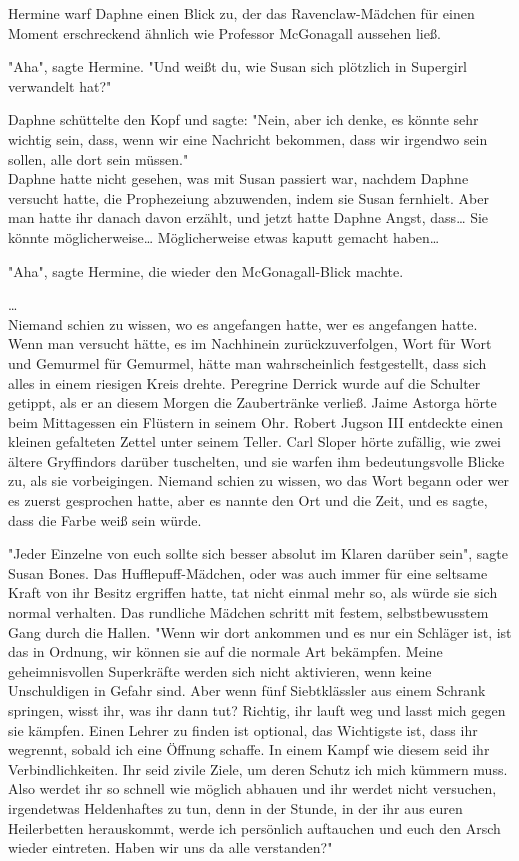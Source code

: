 {Hermine warf Daphne einen Blick zu, der das Ravenclaw-Mädchen für einen Moment erschreckend ähnlich wie Professor McGonagall aussehen ließ.

"Aha", sagte Hermine. "Und weißt du, wie Susan sich plötzlich in Supergirl verwandelt hat?"

Daphne schüttelte den Kopf und sagte: "Nein, aber ich denke, es könnte sehr wichtig sein, dass, wenn wir eine Nachricht bekommen, dass wir irgendwo sein sollen, alle dort sein müssen."\\ Daphne hatte nicht gesehen, was mit Susan passiert war, nachdem Daphne versucht hatte, die Prophezeiung abzuwenden, indem sie Susan fernhielt. Aber man hatte ihr danach davon erzählt, und jetzt hatte Daphne Angst, dass… Sie könnte möglicherweise… Möglicherweise etwas kaputt gemacht haben…

"Aha", sagte Hermine, die wieder den McGonagall-Blick machte.

…\\ Niemand schien zu wissen, wo es angefangen hatte, wer es angefangen hatte. Wenn man versucht hätte, es im Nachhinein zurückzuverfolgen, Wort für Wort und Gemurmel für Gemurmel, hätte man wahrscheinlich festgestellt, dass sich alles in einem riesigen Kreis drehte. Peregrine Derrick wurde auf die Schulter getippt, als er an diesem Morgen die Zaubertränke verließ. Jaime Astorga hörte beim Mittagessen ein Flüstern in seinem Ohr. Robert Jugson III entdeckte einen kleinen gefalteten Zettel unter seinem Teller. Carl Sloper hörte zufällig, wie zwei ältere Gryffindors darüber tuschelten, und sie warfen ihm bedeutungsvolle Blicke zu, als sie vorbeigingen. Niemand schien zu wissen, wo das Wort begann oder wer es zuerst gesprochen hatte, aber es nannte den Ort und die Zeit, und es sagte, dass die Farbe weiß sein würde.

"Jeder Einzelne von euch sollte sich besser absolut im Klaren darüber sein", sagte Susan Bones. Das Hufflepuff-Mädchen, oder was auch immer für eine seltsame Kraft von ihr Besitz ergriffen hatte, tat nicht einmal mehr so, als würde sie sich normal verhalten. Das rundliche Mädchen schritt mit festem, selbstbewusstem Gang durch die Hallen. "Wenn wir dort ankommen und es nur ein Schläger ist, ist das in Ordnung, wir können sie auf die normale Art bekämpfen. Meine geheimnisvollen Superkräfte werden sich nicht aktivieren, wenn keine Unschuldigen in Gefahr sind. Aber wenn fünf Siebtklässler aus einem Schrank springen, wisst ihr, was ihr dann tut? Richtig, ihr lauft weg und lasst mich gegen sie kämpfen. Einen Lehrer zu finden ist optional, das Wichtigste ist, dass ihr wegrennt, sobald ich eine Öffnung schaffe. In einem Kampf wie diesem seid ihr Verbindlichkeiten. Ihr seid zivile Ziele, um deren Schutz ich mich kümmern muss. Also werdet ihr so schnell wie möglich abhauen und ihr werdet nicht versuchen, irgendetwas Heldenhaftes zu tun, denn in der Stunde, in der ihr aus euren Heilerbetten herauskommt, werde ich persönlich auftauchen und euch den Arsch wieder eintreten. Haben wir uns da alle verstanden?"

}

